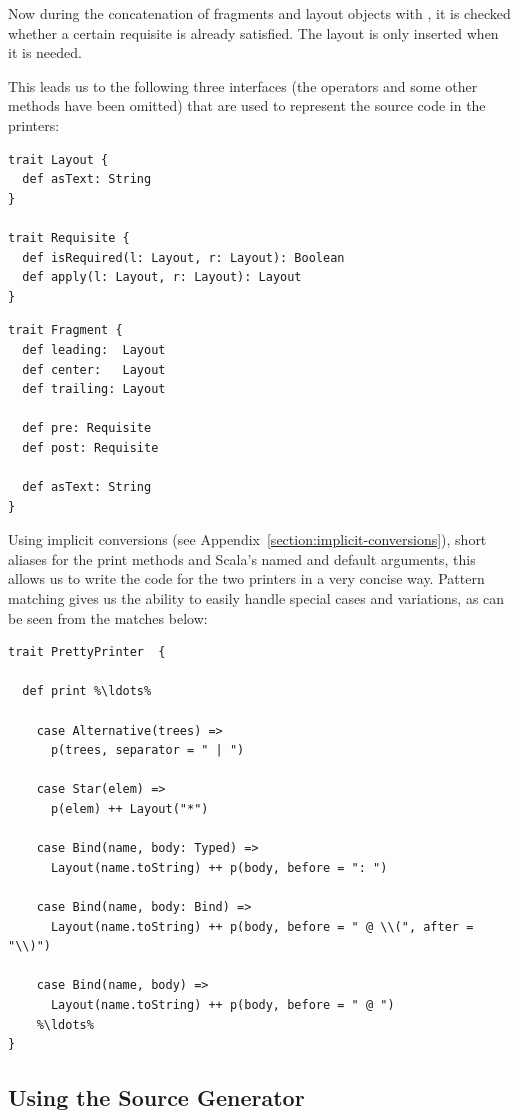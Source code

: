Now during the concatenation of fragments and layout objects with \src{++}, it is checked whether a certain requisite is already satisfied. The  layout is only inserted when it is needed.

This leads us to the following three interfaces (the \src{++} operators and some other methods have been omitted) that are used to represent the source code in the printers:

\begin{lstlisting}
trait Layout {
  def asText: String
}

trait Requisite {  
  def isRequired(l: Layout, r: Layout): Boolean
  def apply(l: Layout, r: Layout): Layout
}
\end{lstlisting}
\begin{lstlisting}
trait Fragment {
  def leading:  Layout
  def center:   Layout
  def trailing: Layout
  
  def pre: Requisite
  def post: Requisite
  
  def asText: String
}
\end{lstlisting}

Using implicit conversions (see Appendix~\vref{section:implicit-conversions}), short aliases for the print methods and Scala's named and default arguments, this allows us to write the code for the two printers in a very concise way. Pattern matching gives us the ability to easily handle special cases and variations, as can be seen from the  matches below:

\begin{lstlisting}
trait PrettyPrinter  {
  
  def print %\ldots%  

    case Alternative(trees) =>
      p(trees, separator = " | ")
      
    case Star(elem) =>
      p(elem) ++ Layout("*")
      
    case Bind(name, body: Typed) =>
      Layout(name.toString) ++ p(body, before = ": ")

    case Bind(name, body: Bind) =>
      Layout(name.toString) ++ p(body, before = " @ \\(", after = "\\)")
      
    case Bind(name, body) =>
      Layout(name.toString) ++ p(body, before = " @ ")
    %\ldots%
}
\end{lstlisting}

\subsection{Using the Source Generator}

